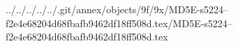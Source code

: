 ../../../../../.git/annex/objects/9f/9x/MD5E-s5224--f2e4e68204d68fbafb9462df18ff508d.tex/MD5E-s5224--f2e4e68204d68fbafb9462df18ff508d.tex
